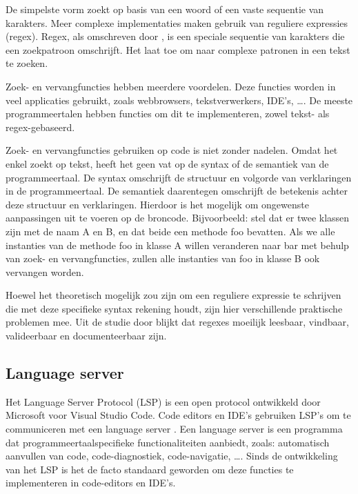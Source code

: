 De simpelste vorm zoekt op basis van een woord of een vaste sequentie van karakters.
Meer complexe implementaties maken gebruik van reguliere expressies (regex).
Regex, als omschreven door \textcite{Goyvaerts2006}, is een speciale sequentie van karakters die een zoekpatroon omschrijft.
Het laat toe om naar complexe patronen in een tekst te zoeken.

Zoek- en vervangfuncties hebben meerdere voordelen.
Deze functies worden in veel applicaties gebruikt, zoals webbrowsers, tekstverwerkers, IDE's, \dots.
De meeste programmeertalen hebben functies om dit te implementeren, zowel tekst- als regex-gebaseerd.

Zoek- en vervangfuncties gebruiken op code is niet zonder nadelen.
Omdat het enkel zoekt op tekst, heeft het geen vat op de syntax of de semantiek van de programmeertaal.
De syntax omschrijft de structuur en volgorde van verklaringen in de programmeertaal.
De semantiek daarentegen omschrijft de betekenis achter deze structuur en verklaringen.
Hierdoor is het mogelijk om ongewenste aanpassingen uit te voeren op de broncode.
Bijvoorbeeld: stel dat er twee klassen zijn met de naam A en B, en dat beide een methode foo bevatten.
Als we alle instanties van de methode foo in klasse A willen veranderen naar bar met behulp van zoek- en vervangfuncties, zullen alle instanties van foo in klasse B ook vervangen worden.

Hoewel het theoretisch mogelijk zou zijn om een reguliere expressie te schrijven die met deze specifieke syntax rekening houdt, zijn hier verschillende praktische problemen mee.
Uit de studie door \textcite{Michael2019} blijkt dat regexes moeilijk leesbaar, vindbaar, valideerbaar en documenteerbaar zijn.

\subsection{Language server}
\label{ch:stand-van-zaken:refactoring:lsp}

Het Language Server Protocol (LSP) is een open protocol ontwikkeld door Microsoft voor Visual Studio Code.
Code editors en IDE's gebruiken LSP's om te communiceren met een language server \autocite{Bork2023}.
Een language server is een programma dat programmeertaalspecifieke functionaliteiten aanbiedt, zoals: automatisch aanvullen van code, code-diagnostiek, code-navigatie, \dots.
Sinds de ontwikkeling van het LSP is het de facto standaard geworden om deze functies te implementeren in code-editors en IDE's.

